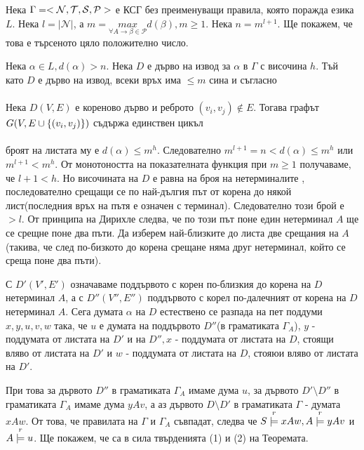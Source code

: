 \documentclass[11pt]{article} %
\begin{document}
{\proof 
Нека $\Gamma = <\mathcal{N}, \mathcal{T}, \mathcal{S}, \mathcal{P}>$ е КСГ без преименуващи правила, която поражда езика $L$. Нека $l = |\mathcal{N}|$, а $m = \underset{\forall A \to \beta \in \mathcal{P}}{max} d(\beta), m \geq 1$. Нека $n = m^{l + 1}$. Ще покажем, че това е търсеното цяло положително число. \par

Нека $\alpha \in L, d(\alpha) > n$. Нека $D$ е дърво на извод за $\alpha$ в $\Gamma$ с височина $h$. Тъй като $D$ е дърво на извод, всеки връх има $\leq m$ сина и съгласно \\\\
 
\theorem Нека $D(V, E)$ е кореново дърво и реброто $(v_{i}, v_{j}) \notin E$. Тогава графът $G(V, E \cup \{(v_{i}, v_{j})\})$  съдържа единствен цикъл \\\\

броят на листата му е $d(\alpha) \leq m^{h}$. Следователно $m^{l+1} = n < d(\alpha) \leq m^{h}$ или $m^{l+1} < m^{h}$. От монотоността на показателната функция при $m \geq 1$ получаваме, че $l + 1 < h$. Но височината на $D$ е равна на броя на нетерминалите , последователно срещащи се по най-дългия път от корена до някой лист(последния връх на пътя е означен с терминал). Следователно този брой е $> l$.
От принципа на Дирихле следва, че по този път поне един нетерминал $A$ ще се срещне поне два пъти. Да изберем най-близките до листа две срещания на $A$(такива, че след по-бизкото до корена срещане няма друг нетерминал, който се среща поне два пъти). \par

С $D'(V', E')$ означаваме поддървото с корен по-близкия до корена на $D$ нетерминал $A$, а с $D''(V'', E'')$ поддървото с корел по-далечният от корена на $D$ нетерминал $A$. Сега думата $\alpha$ на $D$ естествено се разпада на пет поддуми $x, y, u, v, w$ така, че $u$ е думата на поддървото $D''$(в граматиката $\Gamma_{A}$), $y$ - поддумата от листата на $D'$ и на $D'', x$ - поддумата от листата на $D$, стоящи вляво от листата на $D'$ и $w$ - поддумата от листата на $D$, стояюи вляво от листата на $D'$. \par 

При това за дървото $D''$ в граматиката $\Gamma_{A}$ имаме дума $u$, за дървото $D'\setminus D''$ в граматиката $\Gamma_{A}$ имаме дума $yAv$, а аз дървото $D \setminus D'$ в граматиката $\Gamma$ - думата $xAw$. От това, че правилата на $\Gamma$ и $\Gamma_{A}$ съвпадат, следва че $S\overset{r}{\models} xAw, A \overset{r}{\models} yAv$ и $A \overset{r}{\models} u$. Ще покажем, че са в сила твърденията (1) и (2) на Теоремата.

}
\end{document}
